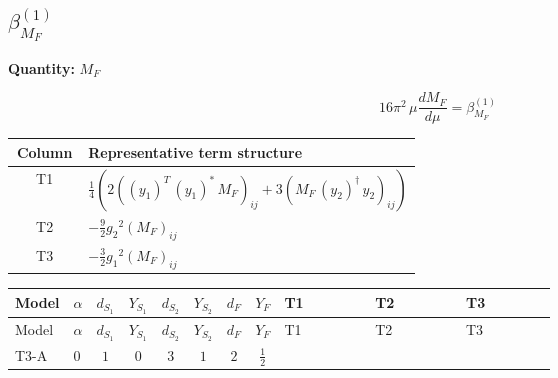 \documentclass[8pt]{article}
\begin{document}
\begin{landscape}
\section*{$\beta_{M_F}^{(1)}$}
\noindent\textbf{Quantity: }$M_F$\par\smallskip
\[16\pi^2\,\mu\frac{d M_F}{d\mu}=\beta_{M_F}^{(1)}\]
\begin{center}
\begin{tabular}{@{}c >{\raggedright\arraybackslash}p{0.82\linewidth}@{}}
\toprule
Column & Representative term structure \\
\midrule
T1 & \(\displaystyle \frac{1}{4} (2 \left(\left({y_1}\right)^{T}\,\left({y_1}\right)^{*}\,{M_F}\right)_{ij}+3 \left({M_F}\,\left({y_2}\right)^{\dagger}\,{y_2}\right)_{ij})\) \\
\midrule
T2 & \(\displaystyle -\frac{9}{2} {g_2}^2 \left({M_F}\right)_{ij}\) \\
\midrule
T3 & \(\displaystyle -\frac{3}{2} {g_1}^2 \left({M_F}\right)_{ij}\) \\
\midrule
\bottomrule
\end{tabular}
\end{center}
\smallskip
\tiny
\begin{longtable}{@{}llcccccc >{\raggedright\arraybackslash}p{0.21\linewidth} >{\raggedright\arraybackslash}p{0.21\linewidth} >{\raggedright\arraybackslash}p{0.21\linewidth}@{}}
\toprule
Model & $\alpha$ & $d_{S_1}$ & $Y_{S_1}$ & $d_{S_2}$ & $Y_{S_2}$ & $d_F$ & $Y_F$ & T1 & T2 & T3 \\
\midrule
\endfirsthead
\toprule
Model & $\alpha$ & $d_{S_1}$ & $Y_{S_1}$ & $d_{S_2}$ & $Y_{S_2}$ & $d_F$ & $Y_F$ & T1 & T2 & T3 \\
\midrule
\endhead
T3-A & $0$ & $1$ & $0$ & $3$ & $1$ & $2$ & $\frac{1}{2}$ & \scriptsize\adjustbox{max width=\linewidth}{$\begin{gathered} \frac{1}{4} (2 \left(\left({y_1}\right)^{T}\,\left({y_1}\right)^{*}\,{M_F}\right)_{ij}+3 \left({M_F}\,\left({y_2}\right)^{\dagger}\,{y_2}\right)_{ij})\end{gathered}$} & \scriptsize\adjustbox{max width=\linewidth}{$\begin{gathered} -\frac{9}{2} {g_2}^2 \left({M_F}\right)_{ij}\end{gathered}$} & \scriptsize\adjustbox{max width=\linewidth}{$\begin{gathered} -\frac{3}{2} {g_1}^2 \left({M_F}\right)_{ij}\end{gathered}$} \\
\midrule
\bottomrule
\end{longtable}
\clearpage

\end{landscape}
\end{document}
